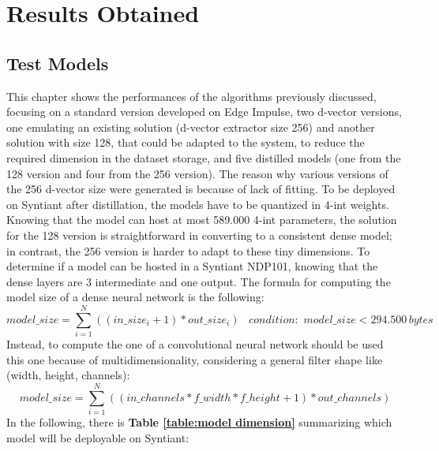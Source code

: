 \chapter{Results Obtained}
\label{cha:results obtained}
\section{Test Models}
\label{sec:test models}
This chapter shows the performances of the algorithms previously discussed, focusing on a standard version developed on Edge Impulse\cite{edgeimpulse_kws_example}, two d-vector versions, one emulating an existing solution\cite{dvector_extractor_TinySV} (d-vector extractor size 256) and another solution with size 128, that could be adapted to the system, to reduce the required dimension in the dataset storage, and five distilled models (one from the 128 version and four from the 256 version). The reason why various versions of the 256 d-vector size were generated is because of lack of fitting. To be deployed on Syntiant after distillation, the models have to be quantized in 4-int weights. Knowing that the model can host at most 589.000 4-int parameters, the solution for the 128 version is straightforward in converting to a consistent dense model; in contrast, the 256 version is harder to adapt to these tiny dimensions. To determine if a model can be hosted in a Syntiant NDP101, knowing that the dense layers are 3 intermediate and one output. The formula for computing the model size of a dense neural network is the following:
\begin{equation*}
    model\_size=\sum_{i=1}^{N}((in\_size_i+1)*out\_size_i)\,\,\,\,\,condition:\,\,model\_size<294.500\,bytes
\end{equation*} 
Instead, to compute the one of a convolutional neural network should be used this one because of multidimensionality, considering a general filter shape like (width, height, channels):
\begin{equation*}
    model\_size=\sum_{i=1}^{N}((in\_channels*f\_width*f\_height+1)*out\_channels)
\end{equation*}
In the following, there is \textbf{Table \ref{table:model dimension}} summarizing which model will be deployable on Syntiant:

